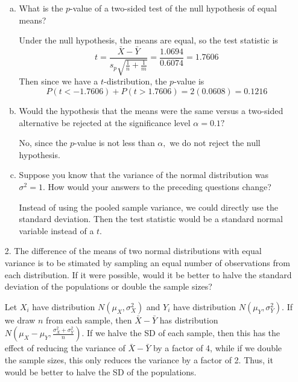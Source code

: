 \documentclass{article}
\begin{document}
\begin{itemize}
\begin{enumerate}[a.]
			\item What is the $p$-value of a two-sided test of the null hypothesis of equal means?
				\begin{soln}
					Under the null hypothesis, the means are equal, so the test statistic is \[t=\frac{\bar{X}-\bar{Y}}{s_p\sqrt{\frac{1}{n}+\frac{1}{m}}}=\frac{1.0694}{0.6074} = 1.7606\] Then since we have a $t$-distribution, the $p$-value is \[P(t<-1.7606) + P(t>1.7606) = 2(0.0608) = 0.1216\]
				\end{soln}

			\item Would the hypothesis that the means were the same versus a two-sided alternative be rejected at the significance level $\alpha=0.1?$
				\begin{answer*}
					No, since the $p$-value is not less than $\alpha,$ we do not reject the null hypothesis.
				\end{answer*}

			\item Suppose you know that the variance of the normal distribution was $\sigma^2=1.$ How would your answers to the preceding questions change?
				\begin{answer*}
					Instead of using the pooled sample variance, we could directly use the standard deviation. Then the test statistic would be a standard normal variable instead of a $t.$
				\end{answer*}
				
		\end{enumerate}

	\item[2.] The difference of the means of two normal distributions with equal variance is to be stimated by sampling an equal number of observations from each distribution. If it were possible, would it be better to halve the standard deviation of the populations or double the sample sizes?
		\begin{answer*}
			Let $X_i$ have distribution $N(\mu_X, \sigma_X^2)$ and $Y_i$ have distribution $N(\mu_Y, \sigma_Y^2).$ If we draw $n$ from each sample, then $\bar{X}-\bar{Y}$ has distribution $N\left( \mu_X-\mu_Y, \frac{\sigma_X^2+\sigma_Y^2}{n} \right).$ If we halve the SD of each sample, then this has the effect of reducing the variance of $\bar{X}-\bar{Y}$ by a factor of 4, while if we double the sample sizes, this only reduces the variance by a factor of 2. Thus, it would be better to halve the SD of the populations.
		\end{answer*}


\end{itemize}
\end{document}
